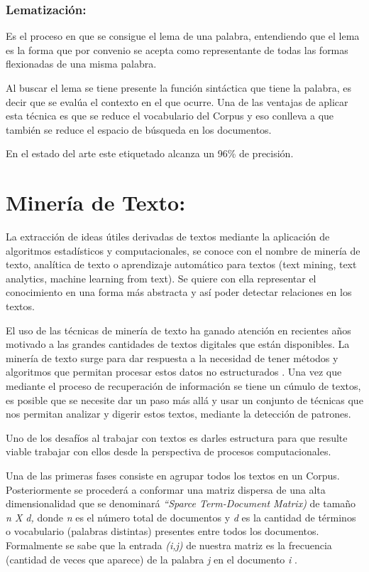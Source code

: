 \documentclass[
  10,
  openany]{book}
\begin{document}
\hypertarget{lematizaciuxf3n}{%
\subsubsection{Lematización:}\label{lematizaciuxf3n}}

Es el proceso en que se consigue el lema de una palabra, entendiendo que el lema es la forma que por convenio se acepta como representante de todas las formas flexionadas de una misma palabra.

Al buscar el lema se tiene presente la función sintáctica que tiene la palabra, es decir que se evalúa el contexto en el que ocurre. Una de las ventajas de aplicar esta técnica es que se reduce el vocabulario del Corpus y eso conlleva a que también se reduce el espacio de búsqueda en los documentos.

En el estado del arte este etiquetado alcanza un 96\% de precisión.

\hypertarget{textmin}{%
\section{Minería de Texto:}\label{textmin}}

La extracción de ideas útiles derivadas de textos mediante la aplicación de algoritmos estadísticos y computacionales, se conoce con el nombre de minería de texto, analítica de texto o aprendizaje automático para textos (text mining, text analytics, machine learning from text). Se quiere con ella representar el conocimiento en una forma más abstracta y así poder detectar relaciones en los textos.

El uso de las técnicas de minería de texto ha ganado atención en recientes años motivado a las grandes cantidades de textos digitales que están disponibles. La minería de texto surge para dar respuesta a la necesidad de tener métodos y algoritmos que permitan procesar estos datos no estructurados \citep{miningt2012} . Una vez que mediante el proceso de recuperación de información se tiene un cúmulo de textos, es posible que se necesite dar un paso más allá y usar un conjunto de técnicas que nos permitan analizar y digerir estos textos, mediante la detección de patrones.

Uno de los desafíos al trabajar con textos es darles estructura para que resulte viable trabajar con ellos desde la perspectiva de procesos computacionales.

Una de las primeras fases consiste en agrupar todos los textos en un Corpus. Posteriormente se procederá a conformar una matriz dispersa de una alta dimensionalidad que se denominará \emph{``Sparce Term-Document Matrix)} de tamaño \emph{n X d,} donde \emph{n} es el número total de documentos y \emph{d} es la cantidad de términos o vocabulario (palabras distintas) presentes entre todos los documentos. Formalmente se sabe que la entrada \emph{(i,j)} de nuestra matriz es la frecuencia (cantidad de veces que aparece) de la palabra \emph{j} en el documento \emph{i} .
\end{document}
